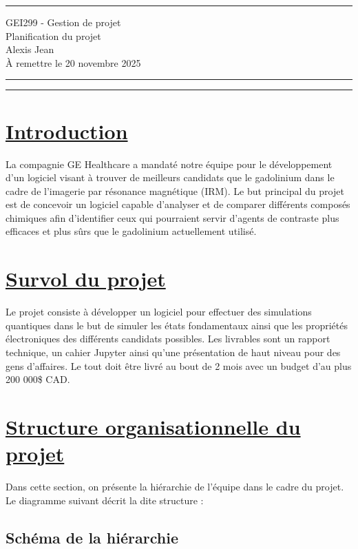 \documentclass[11pt]{article}
\begin{document}
\renewcommand*{\contentsname}{Table des matières}

\hrule

\begin{center}
  {\Large GEI299 - Gestion de projet} \\ \vspace{5mm}
  {\LARGE\sffamily Planification du projet} \\
  Alexis Jean\\
  À remettre le 20 novembre 2025
\end{center}

\hrule

\tableofcontents

\hrule

\section{\underline{Introduction}}
La compagnie GE Healthcare a mandaté notre équipe pour le développement d'un logiciel visant à trouver de meilleurs candidats que le gadolinium dans le cadre de l'imagerie par résonance magnétique (IRM). Le but principal du projet est de concevoir un logiciel capable d'analyser et de comparer différents composés chimiques afin d'identifier ceux qui pourraient servir d'agents de contraste plus efficaces et plus sûrs que le gadolinium actuellement utilisé.


\section{\underline{Survol du projet}}
Le projet consiste à développer un logiciel pour effectuer des simulations quantiques dans le but de simuler les états fondamentaux ainsi que les propriétés électroniques des différents candidats possibles. Les livrables sont un rapport technique, un cahier Jupyter ainsi qu'une présentation de haut niveau pour des gens d'affaires. Le tout doit être livré au bout de 2 mois avec un budget d'au plus 200 000\$ CAD.


\section{\underline{Structure organisationnelle du projet}}
Dans cette section, on présente la hiérarchie de l'équipe dans le cadre du projet. Le diagramme suivant décrit la dite structure :

\newpage

\subsection{Schéma de la hiérarchie}
\end{document}
